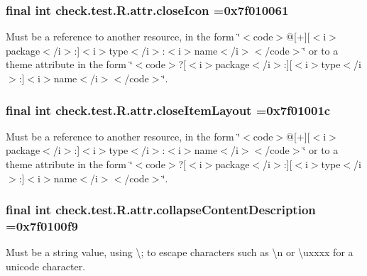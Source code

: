 \subsubsection[{close\+Icon}]{\setlength{\rightskip}{0pt plus 5cm}final int check.\+test.\+R.\+attr.\+close\+Icon =0x7f010061\hspace{0.3cm}{\ttfamily [static]}}\label{classcheck_1_1test_1_1_r_1_1attr_a097e97b7282f3297ba754bfa32c9f891}
Must be a reference to another resource, in the form \char`\"{}$<$code$>$@\mbox{[}+\mbox{]}\mbox{[}$<$i$>$package$<$/i$>$\+:\mbox{]}$<$i$>$type$<$/i$>$\+:$<$i$>$name$<$/i$>$$<$/code$>$\char`\"{} or to a theme attribute in the form \char`\"{}$<$code$>$?\mbox{[}$<$i$>$package$<$/i$>$\+:\mbox{]}\mbox{[}$<$i$>$type$<$/i$>$\+:\mbox{]}$<$i$>$name$<$/i$>$$<$/code$>$\char`\"{}. \hypertarget{classcheck_1_1test_1_1_r_1_1attr_ae35720ea07e5591fd2b0f64f7e642fd3}{}
\subsubsection[{close\+Item\+Layout}]{\setlength{\rightskip}{0pt plus 5cm}final int check.\+test.\+R.\+attr.\+close\+Item\+Layout =0x7f01001c\hspace{0.3cm}{\ttfamily [static]}}\label{classcheck_1_1test_1_1_r_1_1attr_ae35720ea07e5591fd2b0f64f7e642fd3}
Must be a reference to another resource, in the form \char`\"{}$<$code$>$@\mbox{[}+\mbox{]}\mbox{[}$<$i$>$package$<$/i$>$\+:\mbox{]}$<$i$>$type$<$/i$>$\+:$<$i$>$name$<$/i$>$$<$/code$>$\char`\"{} or to a theme attribute in the form \char`\"{}$<$code$>$?\mbox{[}$<$i$>$package$<$/i$>$\+:\mbox{]}\mbox{[}$<$i$>$type$<$/i$>$\+:\mbox{]}$<$i$>$name$<$/i$>$$<$/code$>$\char`\"{}. \hypertarget{classcheck_1_1test_1_1_r_1_1attr_a831929bb7bfa05410b022034fa3b1d23}{}
\subsubsection[{collapse\+Content\+Description}]{\setlength{\rightskip}{0pt plus 5cm}final int check.\+test.\+R.\+attr.\+collapse\+Content\+Description =0x7f0100f9\hspace{0.3cm}{\ttfamily [static]}}\label{classcheck_1_1test_1_1_r_1_1attr_a831929bb7bfa05410b022034fa3b1d23}
Must be a string value, using \textquotesingle{}\textbackslash{};\textquotesingle{} to escape characters such as \textquotesingle{}\textbackslash{}n\textquotesingle{} or \textquotesingle{}\textbackslash{}uxxxx\textquotesingle{} for a unicode character. 

